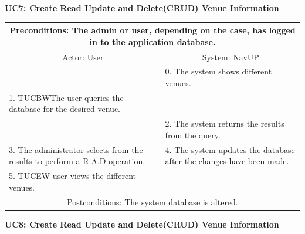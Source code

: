 \documentclass{article}
\begin{document}
				\vspace{5mm}
                \begin{flushleft}
                \textbf{UC7: Create Read Update and Delete(CRUD) Venue Information}\\
                \end{flushleft}
        		\centering			
       		 \small
       		 \begin{tabular}{|p{6cm}|p{6cm}|}
       		 \hline
       		 \multicolumn{2}{c}{\parbox{12cm}{\vspace{2mm}Preconditions: The admin or user, depending on the case, has logged in to the application database.\vspace{2mm}}} \\
       		 \hline
       		 \multicolumn{1}{c}{Actor: User} & \multicolumn{1}{c}{ System: NavUP} \\
        		\hline
       		 & 0.	The system shows different venues.\\
       		 \hline
       		 1.	TUCBWThe user queries the database for the desired venue.\\
 				&2.	The system returns the results from the query.\\
        		\hline
       		 3.	The administrator selects from the results to perform a R.A.D operation. & 4.	The system updates the database after the changes have been made.\\
				\hline
					5.	TUCEW user views the different venues.&\\
       		 \hline
        		\multicolumn{2}{c}{Postconditions: The system database is altered.} \\
        		\hline
        \end{tabular}   
        \newpage
				\vspace{5mm}
                \begin{flushleft}
                \textbf{UC8: Create Read Update and Delete(CRUD) Venue Information}\\
                \end{flushleft}
        		\centering		
       		 \small
\end{document}
